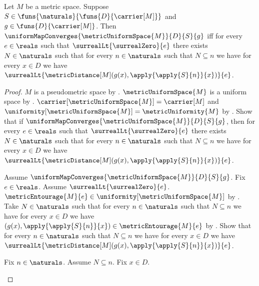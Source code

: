 \begin{theorem}\label{metric_uniform_map_convergence_iff}
    Let $M$ be a metric space.
    Suppose $S\in\funs{\naturals}{\funs{D}{\carrier[M]}}$ and
        $g\in\funs{D}{\carrier[M]}$.
    Then
        $\uniformMapConverges{\metricUniformSpace{M}}{D}{S}{g}$ iff
        for every $e\in\reals$ such that
            $\surrealLt{\surrealZero}{e}$ there exists $N\in\naturals$
            such that for every $n\in\naturals$ such that
                $N\subseteq n$ we have for every $x\in D$ we have
                $\surrealLt{\metricDistance[M]
                    (g(x),\apply{\apply{S}{n}}{x})}{e}$.
\end{theorem}
\begin{proof}
    $M$ is a pseudometric space by
        .
    $\metricUniformSpace{M}$ is a uniform space by
        .
    $\carrier[\metricUniformSpace{M}]=\carrier[M]$ and
        $\uniformity[\metricUniformSpace{M}]=\metricUniformity{M}$
        by
        .
    Show that if
        $\uniformMapConverges{\metricUniformSpace{M}}{D}{S}{g}$, then
        for every $e\in\reals$ such that
            $\surrealLt{\surrealZero}{e}$ there exists $N\in\naturals$
            such that for every $n\in\naturals$ such that
                $N\subseteq n$ we have for every $x\in D$ we have
                $\surrealLt{\metricDistance[M]
                    (g(x),\apply{\apply{S}{n}}{x})}{e}$.
    \begin{subproof}
        Assume $\uniformMapConverges
            {\metricUniformSpace{M}}{D}{S}{g}$.
        Fix $e\in\reals$.
        Assume $\surrealLt{\surrealZero}{e}$.
        $\metricEntourage{M}{e}\in
            \uniformity[\metricUniformSpace{M}]$
            by
            .
        Take $N\in\naturals$ such that for every $n\in\naturals$
            such that $N\subseteq n$ we have for every $x\in D$ we have
            $(g(x),\apply{\apply{S}{n}}{x})
                \in\metricEntourage{M}{e}$
            by .
        Show that for every $n\in\naturals$ such that $N\subseteq n$
            we have for every $x\in D$ we have
            $\surrealLt{\metricDistance[M]
                (g(x),\apply{\apply{S}{n}}{x})}{e}$.
        \begin{subproof}
            Fix $n\in\naturals$.
            Assume $N\subseteq n$.
            Fix $x\in D$.

\end{subproof}
\end{subproof}
\end{proof}
